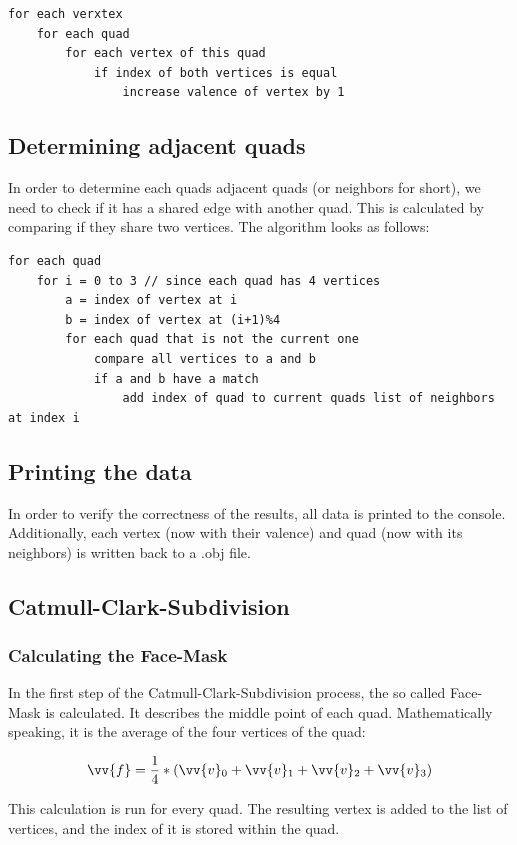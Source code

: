 \documentclass[12pt,a4paper]{scrartcl}
\begin{document}
\begin{lstlisting}[language=PSEUDO]
for each verxtex 
	for each quad 
 		for each vertex of this quad
   			if index of both vertices is equal 
   				increase valence of vertex by 1
\end{lstlisting}

\subsection{Determining adjacent quads}
In order to determine each quads adjacent quads (or neighbors for short), we need to check if it has a shared edge with another quad. This is calculated by comparing if they share two vertices. The algorithm looks as follows:

\begin{lstlisting}[language=PSEUDO]
for each quad
	for i = 0 to 3 // since each quad has 4 vertices
		a = index of vertex at i
		b = index of vertex at (i+1)%4
		for each quad that is not the current one
			compare all vertices to a and b
			if a and b have a match
				add index of quad to current quads list of neighbors at index i 
\end{lstlisting} 

\subsection{Printing the data}
In order to verify the correctness of the results, all data is printed to the console. Additionally, each vertex (now with their valence) and quad (now with its neighbors) is written back to a .obj file.

\subsection{Catmull-Clark-Subdivision}

\subsubsection{Calculating the Face-Mask}
In the first step of the Catmull-Clark-Subdivision process, the so called Face-Mask is calculated. It describes the middle point of each quad. Mathematically speaking, it is the average of the four vertices of the quad:

$$ \vv{f} = \frac{1}{4}*( \vv{v}\textsubscript{0} + \vv{v}\textsubscript{1} + \vv{v}\textsubscript{2} + \vv{v}\textsubscript{3}) $$

This calculation is run for every quad. The resulting vertex is added to the list of vertices, and the index of it is stored within the quad.
\end{document}
